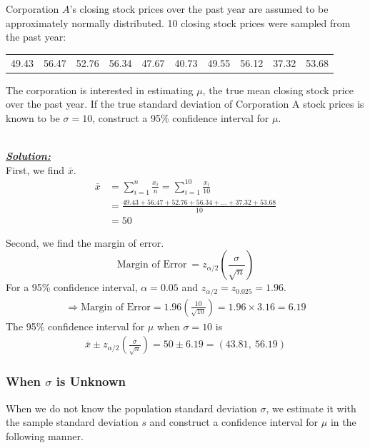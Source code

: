 \begin{example}
\label{exampleCiOnMuSigmaKnown}
Corporation $A$'s closing stock prices over the past year are assumed to be approximately normally distributed. 10 closing stock prices were sampled from the past year:
\begin{center}
\begin{tabular}{cccccccccc}
49.43 & 56.47 & 52.76 & 56.34 & 47.67 & 40.73 & 49.55 & 56.12 & 37.32 & 53.68
\end{tabular}
\end{center}
The corporation is interested in estimating $\mu$, the true mean closing stock price over the past year.
If the true standard deviation of Corporation A stock prices is known to be $\sigma=10$, construct a 95\% confidence interval for $\mu$.

\hfill\\
{\emph{\textbf{\underline{Solution:}}}}\\


First, we find $\bar{x}$.
\begin{align*}
\bar{x} &= \sum_{i=1}^{n} \frac{x_i}{n} = \sum_{i=1}^{10} \frac{x_i}{10} \\
			&=\frac{49.43+56.47+ 52.76 + 56.34 + \hdots + 37.32 + 53.68}{10}\\
			&=50
\end{align*}

Second, we find the margin of error.
\[\text{Margin of Error}~=z_{\alpha/2} \left(\frac{\sigma}{\sqrt{n}}\right) \]
For a 95\% confidence interval, $\alpha = 0.05$ and $z_{\alpha/2} = z_{0.025} = 1.96$.
\begin{align*}
\Rightarrow \text{Margin of Error}= 1.96 \left( \frac{10}{\sqrt{10}} \right) =1.96 \times 3.16 = 6.19
\end{align*}
The 95\% confidence interval for $\mu$ when $\sigma=10$ is 
\begin{align*}
\bar{x} \pm z_{\alpha/2} \left(\frac{\sigma}{\sqrt{n}}\right) = 50 \pm 6.19= (43.81,~56.19)
\end{align*}

\end{example}







\subsubsection{When $\sigma$ is Unknown}
When we do not know the population standard deviation $\sigma$,
we estimate it with the sample standard deviation $s$ and
construct a confidence interval for $\mu$ in the following manner.

